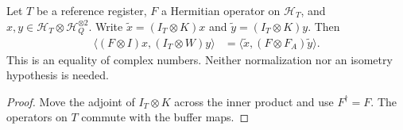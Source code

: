\begin{theorem}
    \label{thm:physical_buffer_overlap_transport}
    \leanok
    Let $T$ be a reference register, $F$ a Hermitian operator on
    $\mathcal H_T$, and $x,y\in\mathcal H_T\otimes\mathcal H_Q^{\otimes2}$.
    Write $\widetilde x=(I_T\otimes K)x$ and
    $\widetilde y=(I_T\otimes K)y$. Then
    \begin{align}
        \langle(F\otimes I)x,(I_T\otimes W)y\rangle
        &=\langle\widetilde x,(F\otimes F_A)\widetilde y\rangle.
        \label{eq:buffer_overlap_transport}
    \end{align}
    This is an equality of complex numbers. Neither normalization nor
    an isometry hypothesis is needed.
\end{theorem}
\begin{proof}\leanok
    Move the adjoint of $I_T\otimes K$ across the inner product and use
    $F^\dagger=F$. The operators on $T$ commute with the buffer maps.
\end{proof}

